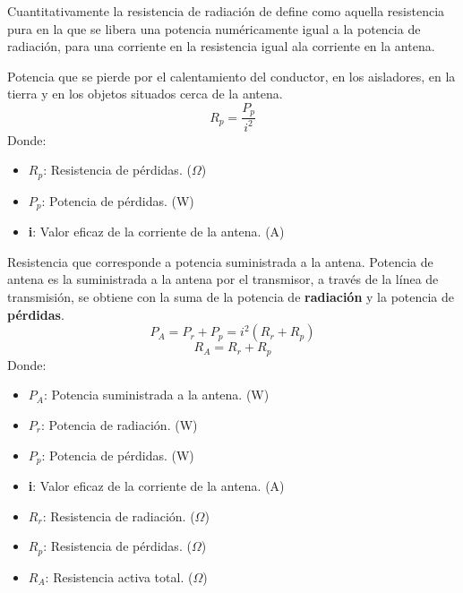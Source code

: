 \documentclass[
	12pt, %
	fleqn, %
	a4paper, %
	oneside, %
]{LegrandOrangeBook}
\begin{document}
Cuantitativamente la resistencia de radiación de define como aquella resistencia pura en la que se libera una potencia numéricamente igual a la potencia de radiación, para una corriente en la resistencia igual ala corriente en la antena.
\begin{definition}
Potencia que se pierde por el calentamiento del conductor, en los aisladores, en la tierra y en los objetos situados cerca de la antena.
\begin{equation*}
R_p=\frac{P_p}{i^2}
\label{eq:resistencia perdidas}
\end{equation*}
Donde:
\begin{itemize}
\item $R_p$: Resistencia de pérdidas. ($\Omega$)
\item $P_p$: Potencia de pérdidas. (W)
\item \textbf{i}: Valor eficaz de la corriente de la antena. (A)
\end{itemize}
\end{definition}
\begin{definition}
Resistencia que corresponde a potencia suministrada a la antena. Potencia de antena es la suministrada a la antena por el transmisor, a través de la línea de transmisión, se obtiene con la suma de la potencia de \textbf{radiación} y la potencia de \textbf{pérdidas}.
\begin{equation}
P_A=P_r+P_p=i^2\left(R_r+R_p\right)
\label{eq:potencia antena}
\end{equation}
\begin{equation}
R_A=R_r+R_p
\end{equation}
Donde:
\begin{itemize}
\item $P_A$: Potencia suministrada a la antena. (W)
\item $P_r$: Potencia de radiación. (W)
\item $P_p$: Potencia de pérdidas. (W)
\item \textbf{i}: Valor eficaz de la corriente de la antena. (A)
\item $R_r$: Resistencia de radiación. ($\Omega$)
\item $R_p$: Resistencia de pérdidas. ($\Omega$)
\item $R_A$: Resistencia activa total. ($\Omega$)
\end{itemize}
\end{definition}
\end{document}
